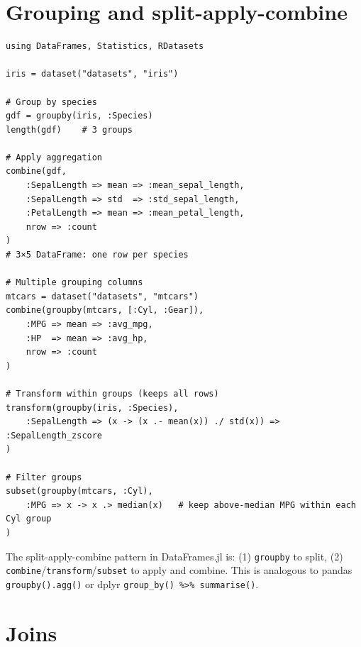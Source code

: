 \section{Grouping and split-apply-combine}

\begin{verbatim}
using DataFrames, Statistics, RDatasets

iris = dataset("datasets", "iris")

# Group by species
gdf = groupby(iris, :Species)
length(gdf)    # 3 groups

# Apply aggregation
combine(gdf,
    :SepalLength => mean => :mean_sepal_length,
    :SepalLength => std  => :std_sepal_length,
    :PetalLength => mean => :mean_petal_length,
    nrow => :count
)
# 3×5 DataFrame: one row per species

# Multiple grouping columns
mtcars = dataset("datasets", "mtcars")
combine(groupby(mtcars, [:Cyl, :Gear]),
    :MPG => mean => :avg_mpg,
    :HP  => mean => :avg_hp,
    nrow => :count
)

# Transform within groups (keeps all rows)
transform(groupby(iris, :Species),
    :SepalLength => (x -> (x .- mean(x)) ./ std(x)) => :SepalLength_zscore
)

# Filter groups
subset(groupby(mtcars, :Cyl),
    :MPG => x -> x .> median(x)   # keep above-median MPG within each Cyl group
)
\end{verbatim}

\begin{juliatip}
The split-apply-combine pattern in DataFrames.jl is: (1) \texttt{groupby} to split, (2) \texttt{combine}/\texttt{transform}/\texttt{subset} to apply and combine. This is analogous to pandas \texttt{groupby().agg()} or dplyr \texttt{group\_by() \%>\% summarise()}.
\end{juliatip}

\section{Joins}

